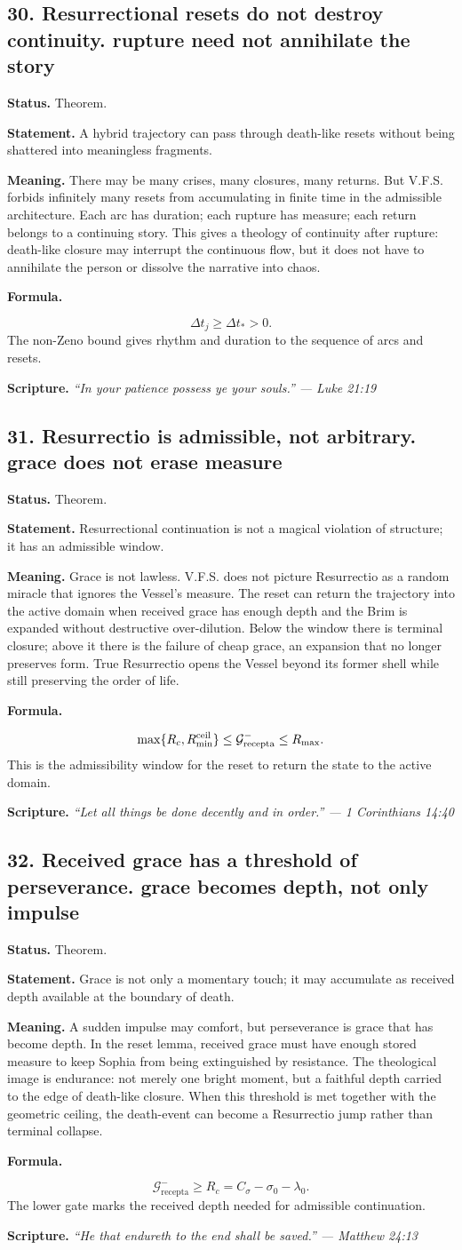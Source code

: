 \documentclass[11pt]{article}
\newcommand{\Grec}{\mathcal{G}_{\mathrm{recepta}}}
\newcommand{\thesis}[2]{%
  \subsection*{#1. #2}%
}
\newcommand{\status}[1]{\textbf{Status.} #1\par}
\newcommand{\statement}[1]{\textbf{Statement.} #1\par}
\newcommand{\explain}[1]{\textbf{Meaning.} #1\par}
\newcommand{\formula}[1]{\textbf{Formula.}\par #1\par}
\newcommand{\scripture}[2]{\textbf{Scripture.} {\small\itshape ``#1'' --- #2}\par}
\begin{document}
\thesis{30}{Resurrectional resets do not destroy continuity. rupture need not annihilate the story}
\status{Theorem.}
\statement{A hybrid trajectory can pass through death-like resets without being shattered into meaningless fragments.}
\explain{There may be many crises, many closures, many returns. But V.F.S. forbids infinitely many resets from accumulating in finite time in the admissible architecture. Each arc has duration; each rupture has measure; each return belongs to a continuing story. This gives a theology of continuity after rupture: death-like closure may interrupt the continuous flow, but it does not have to annihilate the person or dissolve the narrative into chaos.}
\formula{\[
  \Delta t_j\ge \Delta t_*>0.
\]
The non-Zeno bound gives rhythm and duration to the sequence of arcs and resets.}
\scripture{In your patience possess ye your souls.}{Luke 21:19}

\thesis{31}{Resurrectio is admissible, not arbitrary. grace does not erase measure}
\status{Theorem.}
\statement{Resurrectional continuation is not a magical violation of structure; it has an admissible window.}
\explain{Grace is not lawless. V.F.S. does not picture Resurrectio as a random miracle that ignores the Vessel's measure. The reset can return the trajectory into the active domain when received grace has enough depth and the Brim is expanded without destructive over-dilution. Below the window there is terminal closure; above it there is the failure of cheap grace, an expansion that no longer preserves form. True Resurrectio opens the Vessel beyond its former shell while still preserving the order of life.}
\formula{\[
  \max\{R_c,R_{\min}^{\rm ceil}\}
  \le
  \Grec^-
  \le
  R_{\max}.
\]
This is the admissibility window for the reset to return the state to the active domain.}
\scripture{Let all things be done decently and in order.}{1 Corinthians 14:40}

\thesis{32}{Received grace has a threshold of perseverance. grace becomes depth, not only impulse}
\status{Theorem.}
\statement{Grace is not only a momentary touch; it may accumulate as received depth available at the boundary of death.}
\explain{A sudden impulse may comfort, but perseverance is grace that has become depth. In the reset lemma, received grace must have enough stored measure to keep Sophia from being extinguished by resistance. The theological image is endurance: not merely one bright moment, but a faithful depth carried to the edge of death-like closure. When this threshold is met together with the geometric ceiling, the death-event can become a Resurrectio jump rather than terminal collapse.}
\formula{\[
  \Grec^-\ge R_c=C_\sigma-\sigma_0-\lambda_0.
\]
The lower gate marks the received depth needed for admissible continuation.}
\scripture{He that endureth to the end shall be saved.}{Matthew 24:13}
\end{document}
